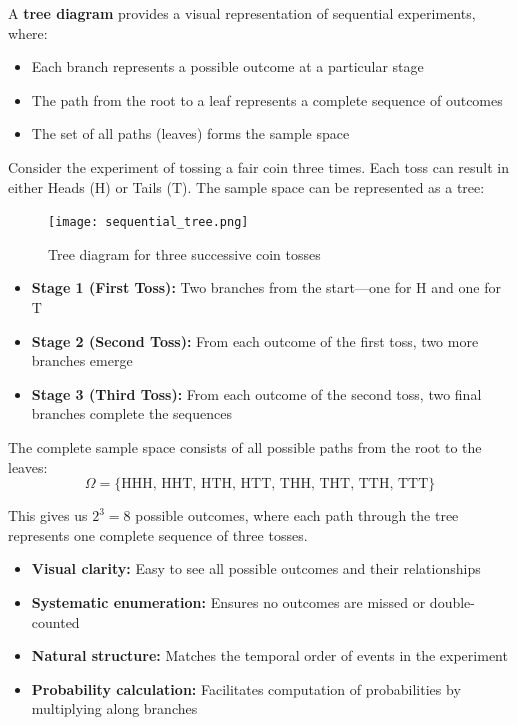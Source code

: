 A \textbf{tree diagram} provides a visual representation of sequential experiments, where:
\begin{itemize}
    \item Each branch represents a possible outcome at a particular stage
    \item The path from the root to a leaf represents a complete sequence of outcomes
    \item The set of all paths (leaves) forms the sample space
\end{itemize}


Consider the experiment of tossing a fair coin three times. Each toss can result in either Heads (H) or Tails (T). The sample space can be represented as a tree:

\begin{figure}[h]
    \centering
    \texttt{[image: sequential\_tree.png]}
    \caption{Tree diagram for three successive coin tosses}
    \label{fig:sequential_tree}
\end{figure}

\begin{itemize}
    \item \textbf{Stage 1 (First Toss):} Two branches from the start—one for H and one for T
    \item \textbf{Stage 2 (Second Toss):} From each outcome of the first toss, two more branches emerge
    \item \textbf{Stage 3 (Third Toss):} From each outcome of the second toss, two final branches complete the sequences
\end{itemize}

The complete sample space consists of all possible paths from the root to the leaves:
\[ \Omega = \{\text{HHH, HHT, HTH, HTT, THH, THT, TTH, TTT}\} \]

This gives us $2^3 = 8$ possible outcomes, where each path through the tree represents one complete sequence of three tosses.

\begin{itemize}
    \item \textbf{Visual clarity:} Easy to see all possible outcomes and their relationships
    \item \textbf{Systematic enumeration:} Ensures no outcomes are missed or double-counted
    \item \textbf{Natural structure:} Matches the temporal order of events in the experiment
    \item \textbf{Probability calculation:} Facilitates computation of probabilities by multiplying along branches
\end{itemize}


